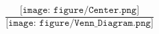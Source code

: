 \documentclass[12pt]{report}
\begin{document}
\begin{equation*}
\frac{\texttt{[image: figure/Center.png]}}{\texttt{[image: figure/Venn\_Diagram.png]}}
\end{equation*}
\end{document}
